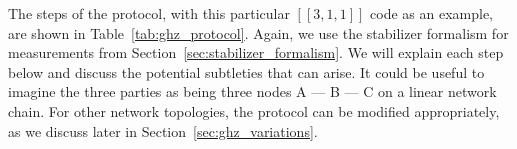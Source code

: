 \documentclass[journal,onecolumn]{IEEEtran}
\newcommand{\llbr}{[\![}
\newcommand{\rrbr}{]\!]}
\newif\ifnotes
\newcommand{\narayanan}[1]{\ifnotes{{\color{blue} [Narayanan: #1]}}\fi}
\begin{document}
The steps of the protocol, with this particular $\llbr 3,1,1 \rrbr$ code as an example, are shown in Table~\ref{tab:ghz_protocol}.
Again, we use the stabilizer formalism for measurements from Section~\ref{sec:stabilizer_formalism}.
We will explain each step below and discuss the potential subtleties that can arise.
It could be useful to imagine the three parties as being three nodes A --- B --- C on a linear network chain.
For other network topologies, the protocol can be modified appropriately, as we discuss later in Section~\ref{sec:ghz_variations}. \\ 
\end{document}
